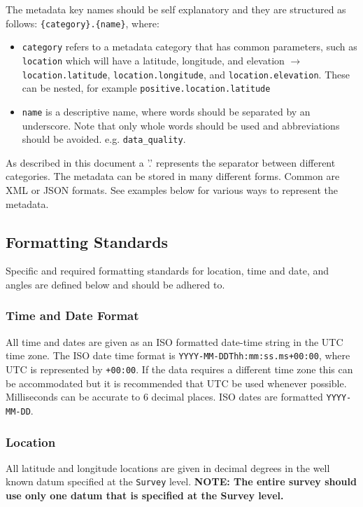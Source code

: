 \documentclass[12pt]{article}
\begin{document}
The metadata key names should be self explanatory and they are structured as follows: \verb|{category}.{name}|, where:
\begin{itemize}
	\item \verb|category| refers to a metadata category that has common parameters, such as \verb|location| which will have a latitude, longitude, and elevation $\longrightarrow$ \verb|location.latitude|, \verb|location.longitude|, and \verb|location.elevation|.  These can be nested, for example \verb|positive.location.latitude|
	\item \verb|name| is a descriptive name, where words should be separated by an underscore. Note that only whole words should be used and abbreviations should be avoided. e.g. \verb|data_quality|.  
\end{itemize}  

As described in this document a '.' represents the separator between different categories.  The metadata can be stored in many different forms.  Common are XML or JSON formats.  See examples below for various ways to represent the metadata.      

\subsection{Formatting Standards}

Specific and required formatting standards for location, time and date, and angles are defined below and should be adhered to.

\subsubsection{Time and Date Format}

All time and dates are given as an ISO formatted date-time string in the UTC time zone.  The ISO date time format is \verb|YYYY-MM-DDThh:mm:ss.ms+00:00|, where UTC is represented by \verb|+00:00|. If the data requires a different time zone this can be accommodated but it is recommended that UTC be used whenever possible. Milliseconds can be accurate to 6 decimal places.  ISO dates are formatted \verb|YYYY-MM-DD|. 

\subsubsection{Location}

All latitude and longitude locations are given in decimal degrees in the well known datum specified at the \verb|Survey| level. \textbf{NOTE: The entire survey should use only one datum that is specified at the Survey level.}
\end{document}
